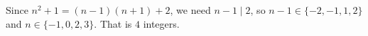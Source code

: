 Since $n^2+1=(n-1)(n+1)+2$, we need $n-1\mid2$, so $n-1\in\{-2,-1,1,2\}$ and $n\in\{-1,0,2,3\}$. That is $\boxed{4}$ integers.
